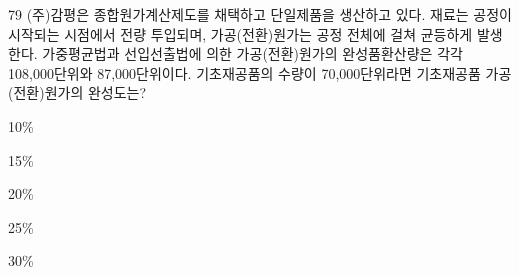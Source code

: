 \begin{question}{79}
(주)감평은 종합원가계산제도를 채택하고 단일제품을 생산하고 있다. 재료는 공정이 시작되는 시점에서 전량 투입되며, 가공(전환)원가는 공정 전체에 걸쳐 균등하게 발생한다. 가중평균법과 선입선출법에 의한 가공(전환)원가의 완성품환산량은 각각 108,000단위와 87,000단위이다. 기초재공품의 수량이 70,000단위라면 기초재공품 가공(전환)원가의 완성도는?
\begin{choices}
  \item 10\%
  \item 15\%
  \item 20\%
  \item 25\%
  \item 30\%
\end{choices}
\end{question}
